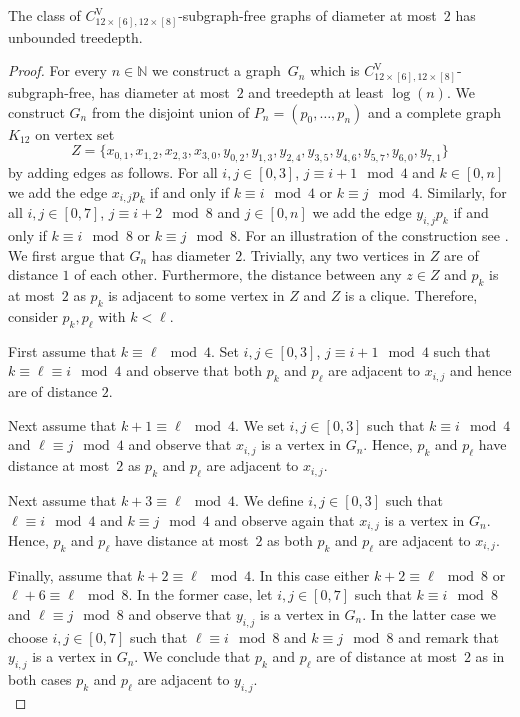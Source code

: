 \documentclass[runningheads,envcountsame]{llncs}
\newcommand{\sharedVertex}[1]{C^{\mathrm{V}}_{#1}}
\begin{document}
\begin{theorem}
\label{thm:CVunbounded}
    The class of $\sharedVertex{12\times [6],12\times [8]}$-subgraph-free graphs of diameter at most~$2$ has unbounded treedepth.
\end{theorem}
\begin{proof}
    For every $n\in \mathbb{N}$ we construct a 
    graph~$G_n$ which is $\sharedVertex{12\times [6],12\times [8]}$-subgraph-free, has diameter at most~$2$ and treedepth at least $\log(n)$.
    We construct $G_n$ from the disjoint union of $P_n=(p_0,\dots,p_n)$ and a complete graph~$K_{12}$ on vertex set $$Z=\{x_{0,1}, x_{1,2},x_{2,3},x_{3,0}, y_{0,2}, y_{1,3},y_{2,4}, y_{3,5},y_{4,6},y_{5,7},y_{6,0},y_{7,1}\}$$ 
    by adding edges as follows. For all $i,j\in [0,3]$, $j\equiv i+1\mod 4$ and $k\in [0,n]$ we add the edge $x_{i,j}p_k$ if and only if $k\equiv i \mod 4$ or $k\equiv j \mod 4$. Similarly, for all $i,j\in [0,7]$, $j\equiv i+2\mod 8$ and $j\in [0,n]$ we add the edge $y_{i,j}p_k$ if and only if $k\equiv i \mod 8$ or $k\equiv j \mod 8$. For an illustration of the construction see .\\

    We first argue that $G_n$ has diameter $2$. Trivially, any two vertices in $Z$ are of distance $1$ of each other. Furthermore, the distance between any $z\in Z$ and $p_k$ is at most~$2$ as $p_k$ is adjacent to some vertex in $Z$ and $Z$ is a clique. Therefore, consider $p_k,p_\ell$ with $k<\ell$. 
    
    First assume that $k\equiv \ell \mod 4$.  Set $i,j\in [0,3]$, $j\equiv i+1\mod 4$ such that $k\equiv \ell \equiv i \mod 4$ and observe that both $p_k$ and $p_\ell$ are adjacent to $x_{i,j}$ and hence are of distance $2$.
    
    Next assume that $k+1\equiv \ell \mod 4$. We set  $i,j\in [0,3]$ such that $k\equiv i\mod 4$ and $\ell \equiv j \mod 4$ and observe that $x_{i,j}$ is a vertex in $G_n$. Hence, $p_k$ and $p_\ell$ have distance at most~$2$ as $p_k$ and $p_\ell$ are adjacent to $x_{i,j}$.

    Next assume that $k+3 \equiv \ell \mod 4$. We define $i,j\in [0,3]$ such that $\ell\equiv i\mod 4$ and $k \equiv j \mod 4$ and observe again that $x_{i,j}$ is a vertex in $G_n$. Hence, $p_k$ and $p_\ell$ have distance at most~$2$ as both $p_k$ and $p_\ell$ are adjacent to $x_{i,j}$.

     Finally, assume that $k+2 \equiv \ell \mod 4$. In this case either $k+2\equiv \ell \mod 8$ or $\ell+6 \equiv \ell \mod 8$. In the former case, let $i,j\in [0,7]$ such that $k\equiv i\mod 8$ and $\ell\equiv j\mod 8$ and observe that $y_{i,j}$ is a vertex in $G_n$. In the latter case we choose $i,j\in [0,7]$ such that $\ell\equiv i\mod 8$ and $k\equiv j\mod 8$ and remark that $y_{i,j}$ is a vertex in $G_n$. We conclude that $p_k$ and $p_\ell$ are of distance at most~$2$ as in both cases $p_k$ and $p_\ell$ are adjacent to $y_{i,j}$.\\


\end{proof}
\end{document}
